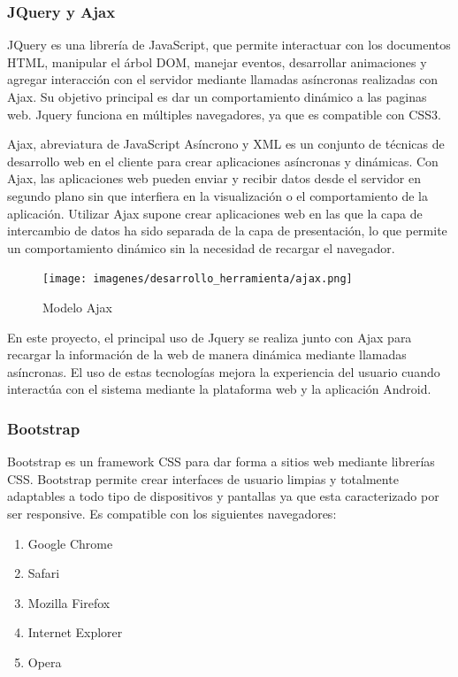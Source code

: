 \documentclass[a4paper,11pt]{book}
\begin{document}
\subsubsection{JQuery y Ajax}

JQuery\cite{jq} es una librería de JavaScript, que permite interactuar con los documentos HTML, manipular el árbol DOM, manejar eventos, desarrollar animaciones y agregar interacción con el servidor mediante llamadas asíncronas realizadas con Ajax. Su objetivo principal es dar un comportamiento dinámico a las paginas web. Jquery funciona en múltiples navegadores, ya que es compatible con CSS3.  

Ajax\cite{aj}, abreviatura de JavaScript Asíncrono y XML es un conjunto de técnicas de desarrollo web en el cliente para crear aplicaciones asíncronas y dinámicas. Con Ajax, las aplicaciones web pueden enviar y recibir datos desde el servidor en segundo plano sin que interfiera en la visualización o el comportamiento de la aplicación. Utilizar Ajax supone crear aplicaciones web en las que la capa de intercambio de datos ha sido separada de la capa de presentación, lo que permite un comportamiento dinámico sin la necesidad de recargar el navegador. 

\begin{figure}[H] 
\centering 
\texttt{[image: imagenes/desarrollo\_herramienta/ajax.png]}
\caption{ Modelo Ajax\cite{aj2}  }  
\end{figure}   

En este proyecto, el principal uso de Jquery se realiza junto con Ajax para recargar la información de la web de manera dinámica mediante llamadas asíncronas. El uso de estas tecnologías mejora la experiencia del usuario cuando interactúa con el sistema mediante la plataforma web y la aplicación Android.


\subsubsection{Bootstrap}
Bootstrap\cite{boo} es un framework CSS para dar forma a sitios web mediante librerías CSS. Bootstrap  permite crear interfaces de usuario limpias y totalmente adaptables a todo tipo de dispositivos y pantallas ya que esta caracterizado por ser responsive. Es compatible con los siguientes navegadores: 

\begin{enumerate}
\item Google Chrome
\item Safari
\item Mozilla Firefox 
\item Internet Explorer 
\item Opera  
\end{enumerate}
  
\end{document}
